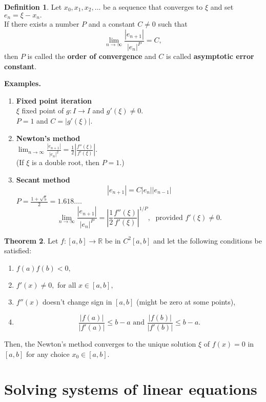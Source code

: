 \documentclass[12pt]{article}
\theoremstyle{definition}
\newtheorem{thm}{Theorem}
\newtheorem{defn}[thm]{Definition}
\begin{document}
\begin{defn} 
	Let $x_0, x_1, x_2, \ldots$ be a sequence that converges to $\xi$ and set $e_n = \xi - x_n.$\\
	If there exists a number $P$ and a constant $C \neq 0$ such that
	\[\lim_{n\to \infty}\frac{|e_{n+1}|}{|e_n|^P} = C,\]
	then $P$ is called the \textbf{order of convergence} and $C$ is called \textbf{asymptotic error constant}.
\end{defn}

\textbf{Examples.}
\begin{enumerate} 
	\item \textbf{Fixed point iteration}\\
	$\xi$ fixed point of $g:I\to I$ and $g'(\xi) \neq 0.$\\
	$P = 1$ and $C = |g'(\xi)|.$
	\item \textbf{Newton's method}\\
	$\displaystyle\lim_{n\to \infty}\frac{|e_{n+1}|}{|e_n|^2} = \frac{1}{2}\left|\frac{f''(\xi)}{f'(\xi)}\right|.$\\
	(If $\xi$ is a double root, then $P = 1.$)
	\item \textbf{Secant method}
	\[|e_{n+1}| = C|e_n||e_{n-1}|\]
	$P = \frac{1 + \sqrt{5}}{2} = 1.618\ldots.$\\
	\[\lim_{n\to \infty}\frac{|e_{n+1}|}{|e_n|^P} = \left|\frac{1}{2}\frac{f''(\xi)}{f'(\xi)}\right|^{1/P},\;\text{ provided }f'(\xi) \neq 0.\]
\end{enumerate}

\begin{thm} 
	Let $f:[a, b] \to \mathbb{R}$ be in $C^2[a, b]$ and let the following conditions be satisfied:
	\begin{enumerate}[nosep] 
		\item $f(a)f(b) < 0,$
		\item $f'(x) \neq 0,$ for all $x \in [a, b],$
		\item $f''(x)$ doesn't change sign in $[a, b]$ (might be zero at some points),
		\item 
		\[\frac{|f(a)|}{|f'(a)|} \le b - a \text{ and }\frac{|f(b)|}{|f'(b)|} \le b - a.\]
	\end{enumerate}
	Then, the Newton's method converges to the unique solution $\xi$ of $f(x) = 0$ in $[a, b]$ for any choice $x_0 \in [a, b].$
\end{thm}

\section{Solving systems of linear equations}
\end{document}

